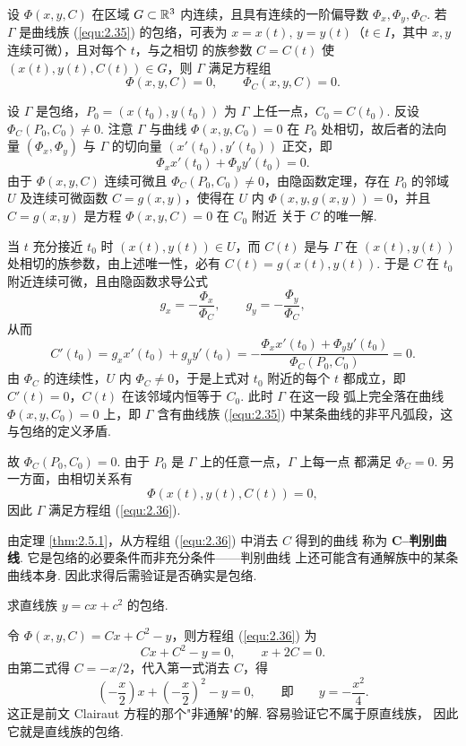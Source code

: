 \begin{thm}\label{thm:2.5.1}
设 $\Phi(x,y,C)$ 在区域 $G\subset\mathbb{R}^3$ 内连续，且具有连续的一阶偏导数
$\Phi_x,\Phi_y,\Phi_C$. 若 $\Gamma$ 是曲线族 (\ref{equ:2.35}) 的包络，可表为
$x=x(t),\,y=y(t)$（$t\in I$，其中 $x,y$ 连续可微），且对每个 $t$，与之相切
的族参数 $C=C(t)$ 使 $(x(t),y(t),C(t))\in G$，则 $\Gamma$ 满足方程组
\begin{equation}\label{equ:2.36}
\Phi(x,y,C)=0,\qquad \Phi_C(x,y,C)=0.
\end{equation}
\end{thm}
\begin{pf1}
设 $\Gamma$ 是包络，$P_0=(x(t_0),y(t_0))$ 为 $\Gamma$ 上任一点，$C_0=C(t_0)$.
反设 $\Phi_C(P_0,C_0)\neq0$. 注意 $\Gamma$ 与曲线 $\Phi(x,y,C_0)=0$ 在 $P_0$
处相切，故后者的法向量 $(\Phi_x,\Phi_y)$ 与 $\Gamma$ 的切向量
$(x'(t_0),y'(t_0))$ 正交，即
\[
\Phi_x x'(t_0)+\Phi_y y'(t_0)=0.
\]
由于 $\Phi(x,y,C)$ 连续可微且 $\Phi_C(P_0,C_0)\neq0$，由隐函数定理，存在
$P_0$ 的邻域 $U$ 及连续可微函数 $C=g(x,y)$，使得在 $U$ 内
$\Phi(x,y,g(x,y))=0$，并且 $C=g(x,y)$ 是方程 $\Phi(x,y,C)=0$ 在 $C_0$ 附近
关于 $C$ 的唯一解.

当 $t$ 充分接近 $t_0$ 时 $(x(t),y(t))\in U$，而 $C(t)$ 是与 $\Gamma$ 在
$(x(t),y(t))$ 处相切的族参数，由上述唯一性，必有
$C(t)=g(x(t),y(t))$. 于是 $C$ 在 $t_0$ 附近连续可微，且由隐函数求导公式
\[
g_x=-\frac{\Phi_x}{\Phi_C},\qquad g_y=-\frac{\Phi_y}{\Phi_C},
\]
从而
\[
C'(t_0)=g_x x'(t_0)+g_y y'(t_0)
=-\frac{\Phi_x x'(t_0)+\Phi_y y'(t_0)}{\Phi_C(P_0,C_0)}=0.
\]
由 $\Phi_C$ 的连续性，$U$ 内 $\Phi_C\neq0$，于是上式对 $t_0$ 附近的每个 $t$
都成立，即 $C'(t)=0$，$C(t)$ 在该邻域内恒等于 $C_0$. 此时 $\Gamma$ 在这一段
弧上完全落在曲线 $\Phi(x,y,C_0)=0$ 上，即 $\Gamma$ 含有曲线族
(\ref{equ:2.35}) 中某条曲线的非平凡弧段，这与包络的定义矛盾.

故 $\Phi_C(P_0,C_0)=0$. 由于 $P_0$ 是 $\Gamma$ 上的任意一点，$\Gamma$ 上每一点
都满足 $\Phi_C=0$. 另一方面，由相切关系有
\[
\Phi(x(t),y(t),C(t))=0,
\]
因此 $\Gamma$ 满足方程组 (\ref{equ:2.36}).
\end{pf1}
\begin{rmk}
由定理 \ref{thm:2.5.1}，从方程组 (\ref{equ:2.36}) 中消去 $C$ 得到的曲线
称为 \textbf{C--判别曲线}. 它是包络的必要条件而非充分条件——判别曲线
上还可能含有通解族中的某条曲线本身. 因此求得后需验证是否确实是包络.
\end{rmk}

\begin{eg}
求直线族 $y=cx+c^2$ 的包络.
\begin{pf2}
令 $\Phi(x,y,C)=Cx+C^2-y$，则方程组 (\ref{equ:2.36}) 为
\[
Cx+C^2-y=0,\qquad x+2C=0.
\]
由第二式得 $C=-x/2$，代入第一式消去 $C$，得
\[
\left(-\frac{x}{2}\right)x+\left(-\frac{x}{2}\right)^2-y=0,
\qquad\text{即}\qquad y=-\frac{x^2}{4}.
\]
这正是前文 Clairaut 方程的那个"非通解"的解. 容易验证它不属于原直线族，
因此它就是直线族的包络.
\end{pf2}
\end{eg}

